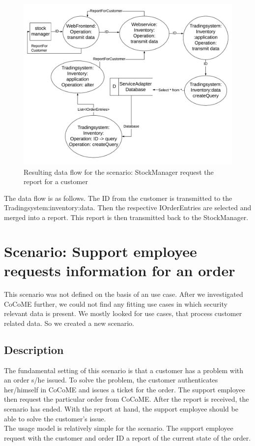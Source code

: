 \begin{figure}
\includegraphics[scale=.75, angle= 90]{logos/Data_flow_UC13.pdf}
\caption{Resulting data flow for the scenario: StockManager request the report for a customer}
\label{fig:uc13DFD}
\end{figure}
The data flow is as follows. The ID from the customer is transmitted to the Tradingsystem:inventory:data. Then the respective IOrderEntries are selected and merged into a report. This report is then transmitted back to the StockManager. 


\section{Scenario: Support employee requests information for an order}
This scenario was not defined on the basis of an use case. After we investigated CoCoME further, we could not find any fitting use cases in which security relevant data is present. We mostly looked for use cases, that process customer related data. So we created a new scenario. 
\subsection{Description}
\label{scn2_ch4}
The fundamental setting of this scenario is that a customer has a problem with an order s/he issued. To solve the problem, the customer authenticates her/himself in CoCoME and issues a ticket for the order. The support employee then request the particular order from CoCoME. After the report is received, the scenario has ended. With the report at hand, the support employee should be able to solve the customer's issue.\\
The usage model is relatively simple for the scenario. The support employee request with the customer and order ID a report of the current state of the order.

